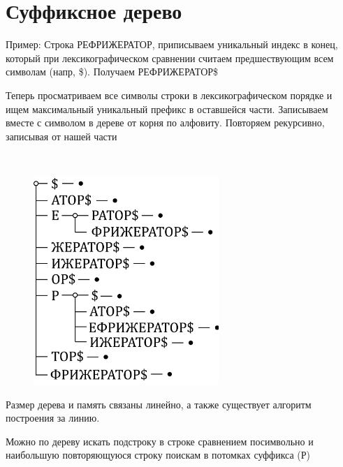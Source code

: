 \documentclass[discrete.tex]{subfiles}
\begin{document}
  \section{Суффиксное дерево}
  
  \begin{alg}
    Пример: Строка РЕФРИЖЕРАТОР, приписываем уникальный индекс в конец, который при лексикографическом сравнении считаем предшествующим всем символам (напр, \$). Получаем РЕФРИЖЕРАТОР\$

    Теперь просматриваем все символы строки в лексикографическом порядке и ищем максимальный уникальный префикс в оставшейся части. Записываем вместе с символом в дереве от корня по алфовиту. Повторяем рекурсивно, записывая от нашей части
  \end{alg}

  \begin{example}[РЕФРИЖЕРАТОР] \
    \begin{figure}[H]
        \includegraphics[width=7cm]{pics/23_1.png}
        \centering
    \end{figure}
  \end{example}

  \begin{remark}
    Размер дерева и память связаны линейно, а также существует алгоритм построения за линию.

    Можно по дереву искать подстроку в строке сравнением посимвольно и наибольшую повторяющуюся строку поискам в потомках суффикса (Р)
  \end{remark}
\end{document}
